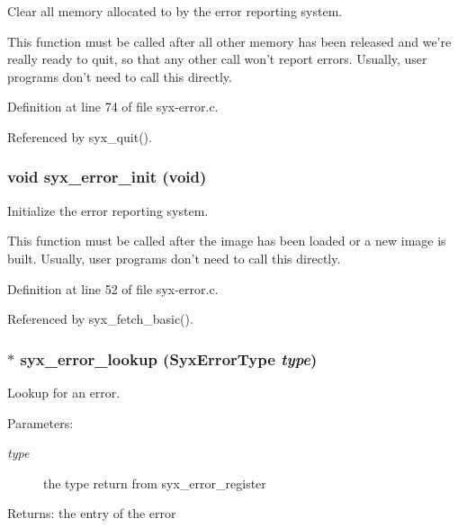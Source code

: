 Clear all memory allocated to by the error reporting system.

This function must be called after all other memory has been released and we're really ready to quit, so that any other call won't report errors. Usually, user programs don't need to call this directly. 

Definition at line 74 of file syx-error.c.

Referenced by syx\_\-quit().\hypertarget{syx-error_8c_10bc732864cef02c21c3956aa28cb7a5}{
\subsubsection{\setlength{\rightskip}{0pt plus 5cm}void syx\_\-error\_\-init (void)}}
\label{syx-error_8c_10bc732864cef02c21c3956aa28cb7a5}


Initialize the error reporting system.

This function must be called after the image has been loaded or a new image is built. Usually, user programs don't need to call this directly. 

Definition at line 52 of file syx-error.c.

Referenced by syx\_\-fetch\_\-basic().\hypertarget{syx-error_8c_0917cc39dfeb4a377f015a0c7a28fe10}{
\subsubsection{$\ast$ syx\_\-error\_\-lookup ({\bf SyxErrorType} {\em type})}}
\label{syx-error_8c_0917cc39dfeb4a377f015a0c7a28fe10}


Lookup for an error.

\begin{Desc}
\item[Parameters:]
\begin{description}
\item[{\em type}]the type return from syx\_\-error\_\-register \end{description}
\end{Desc}
\begin{Desc}
\item[Returns:]the entry of the error \end{Desc}


